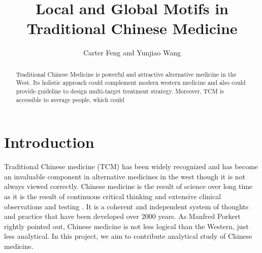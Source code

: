 \documentclass{article}
\title{Local and Global Motifs in Traditional Chinese Medicine}
\author{Carter Feng and Yunjiao Wang}
\begin{document}
\maketitle
\begin{abstract}
    Traditional Chinese Medicine is powerful and attractive alternative medicine in the West. Its holistic approach could complement modern western medicine and also could provide guideline to design multi-target treatment strategy. Moreover, TCM is accessible to average people, which could    
\end{abstract}
\section{Introduction}
Traditional Chinese medicine (TCM) has been widely recognized and has become an invaluable component in alternative medicines in the west \cite{Kaptchuk2000} though it is not always viewed correctly.   Chinese medicine is the result of science over long time as it is the result of continuous critical thinking and extensive clinical observations and testing \cite{Kaptchuk2000}. It is a coherent and independent system of thoughts and practice that have been developed over 2000 years.   As Manfred Porkert \cite{Porkert1990} rightly pointed out, Chinese medicine is not less logical than the Western, just less analytical. In this project, we aim to contribute analytical study of Chinese medicine. 
\end{document}
